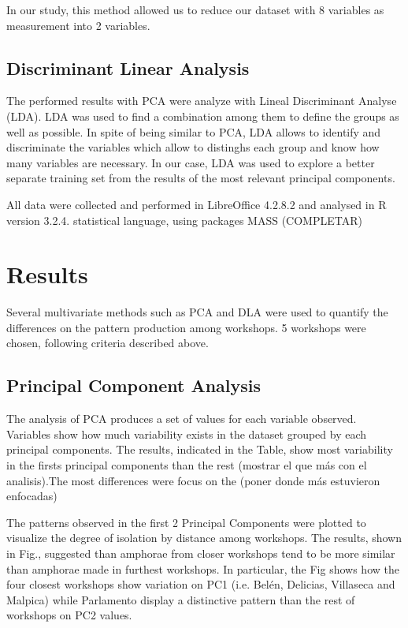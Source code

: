 \documentclass[review]{elsarticle}
\begin{document}
In our study, this method allowed us to reduce our dataset with 8 variables as measurement into 2 variables. 

\subsection{Discriminant Linear Analysis} 


The performed results with PCA were analyze with Lineal Discriminant Analyse (LDA). LDA was used to find a combination among them to define the groups as well as possible. In spite of being similar to PCA, LDA allows to identify and discriminate the variables which allow to distinghs each group and know how many variables are necessary. In our case, LDA was used to explore a better separate training set from the results of the most relevant principal components. 

All data were collected and performed in LibreOffice 4.2.8.2 and analysed in R version 3.2.4. statistical language, using packages MASS (COMPLETAR)


\section{Results}

Several multivariate methods such as PCA and DLA were used to quantify the differences on the pattern production among workshops. 5 workshops were chosen, following criteria described above. 

\subsection{Principal Component Analysis}

The analysis of PCA produces a set of values for each variable observed. Variables show how much variability exists in the dataset grouped by each principal components. The results, indicated in the Table, show most variability in the firsts principal components than the rest (mostrar el que más con el analisis).The most differences were focus on the (poner donde más estuvieron enfocadas)

The patterns observed in the first 2 Principal Components were plotted to visualize the degree of isolation by distance among workshops. The results, shown in Fig., suggested than amphorae from closer workshops tend to be more similar than amphorae made in furthest workshops. In particular, the Fig shows how the four closest workshops show variation on PC1 (i.e. Belén, Delicias, Villaseca and Malpica) while Parlamento display a distinctive pattern than the rest of workshops on PC2 values. 
\end{document}
